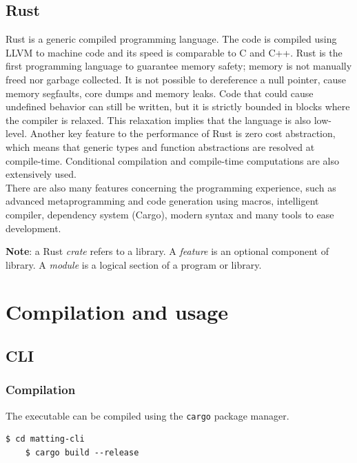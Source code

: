 \documentclass[a4paper]{article}
\begin{document}
\wrapfill

\pagebreak

\subsection{Rust}

\gls{Rust}\cite{rust} is a generic compiled programming language.
The code is compiled using LLVM to machine code and its speed
is comparable to \gls{C} and \gls{C++}.
Rust is the first programming language to guarantee memory safety;
memory is not manually freed nor garbage collected.
It is not possible to dereference a null pointer, cause memory \gls{segfault}s, core dumps
and memory leaks.
Code that could cause undefined behavior can still be written,
but it is strictly bounded in blocks where the compiler is relaxed.
This relaxation implies that the language is also low-level.
Another key feature to the performance of Rust is zero cost abstraction,
which means that generic types and function abstractions are resolved at compile-time.
Conditional compilation and compile-time computations are also extensively used.
\\
There are also many features concerning the programming experience, such as
advanced metaprogramming and code generation using macros, intelligent compiler,
dependency system (Cargo), modern syntax and many tools to ease development.

\textbf{\color{red} Note}: a Rust \textit{crate} refers to a library.
A \textit{feature} is an optional component of library.
A \textit{module} is a logical section of a program or library.

\pagebreak

\section{Compilation and usage}

\subsection{CLI}

\subsubsection{Compilation}

The executable can be compiled using the \texttt{\gls{cargo}}
package manager.

\begin{lstlisting}[style=boxed]
    $ cd matting-cli
    $ cargo build --release
\end{lstlisting}
\end{document}
